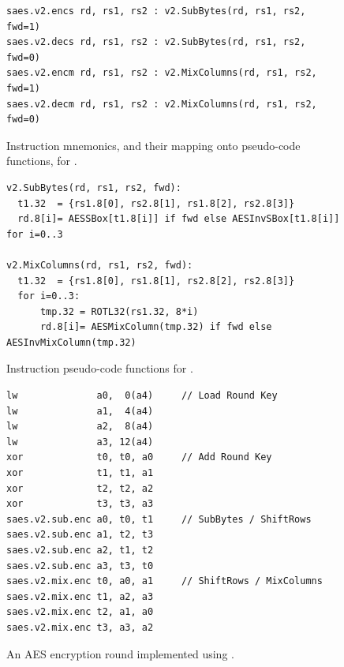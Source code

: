 
\begin{figure}[!h]
\begin{lstlisting}[language=pseudo,style=block]
saes.v2.encs rd, rs1, rs2 : v2.SubBytes(rd, rs1, rs2, fwd=1)
saes.v2.decs rd, rs1, rs2 : v2.SubBytes(rd, rs1, rs2, fwd=0)
saes.v2.encm rd, rs1, rs2 : v2.MixColumns(rd, rs1, rs2, fwd=1)
saes.v2.decm rd, rs1, rs2 : v2.MixColumns(rd, rs1, rs2, fwd=0)
\end{lstlisting}
\caption{
  Instruction mnemonics, and their mapping onto pseudo-code functions, for .
}
\label{fig:v2:mnemonics}
\end{figure}

\begin{figure}[!h]
\begin{lstlisting}[language=pseudo,style=block]
v2.SubBytes(rd, rs1, rs2, fwd):
  t1.32  = {rs1.8[0], rs2.8[1], rs1.8[2], rs2.8[3]}
  rd.8[i]= AESSBox[t1.8[i]] if fwd else AESInvSBox[t1.8[i]] for i=0..3

v2.MixColumns(rd, rs1, rs2, fwd):
  t1.32  = {rs1.8[0], rs1.8[1], rs2.8[2], rs2.8[3]}
  for i=0..3:
      tmp.32 = ROTL32(rs1.32, 8*i)
      rd.8[i]= AESMixColumn(tmp.32) if fwd else AESInvMixColumn(tmp.32)
\end{lstlisting}
\caption{
  Instruction pseudo-code functions for .
}
\label{fig:v2:pseudo}
\end{figure}

\begin{figure}[!h]
\begin{lstlisting}[language=pseudo,style=block]
lw              a0,  0(a4)     // Load Round Key
lw              a1,  4(a4)
lw              a2,  8(a4)
lw              a3, 12(a4)
xor             t0, t0, a0     // Add Round Key
xor             t1, t1, a1
xor             t2, t2, a2
xor             t3, t3, a3
saes.v2.sub.enc a0, t0, t1     // SubBytes / ShiftRows
saes.v2.sub.enc a1, t2, t3
saes.v2.sub.enc a2, t1, t2
saes.v2.sub.enc a3, t3, t0
saes.v2.mix.enc t0, a0, a1     // ShiftRows / MixColumns
saes.v2.mix.enc t1, a2, a3
saes.v2.mix.enc t2, a1, a0
saes.v2.mix.enc t3, a3, a2
\end{lstlisting}
\caption{
  An AES encryption round implemented using .
}
\label{fig:v2:round}
\end{figure}

\newpage

